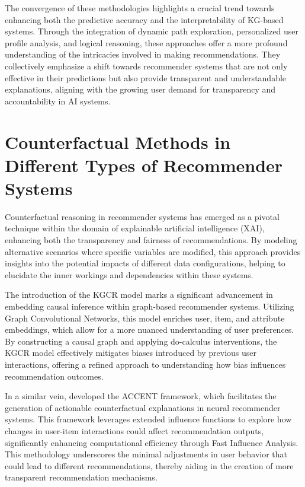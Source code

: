 The convergence of these methodologies highlights a crucial trend towards enhancing
both the predictive accuracy and the interpretability of KG-based systems.
Through the integration of dynamic path exploration, personalized user profile analysis,
and logical reasoning, these approaches offer a more profound understanding of the
intricacies involved in making recommendations. They collectively emphasize a
shift towards recommender systems that are not only effective in their
predictions but also provide transparent and understandable explanations, aligning
with the growing user demand for transparency and accountability in AI systems.

\section{Counterfactual Methods in Different Types of Recommender Systems}

Counterfactual reasoning in recommender systems has emerged as a pivotal
technique within the domain of explainable artificial intelligence (XAI), enhancing
both the transparency and fairness of recommendations. By modeling alternative
scenarios where specific variables are modified, this approach provides insights
into the potential impacts of different data configurations, helping to
elucidate the inner workings and dependencies within these systems.

The introduction of the KGCR model \parencite{wei_causal_2023} marks a significant advancement
in embedding causal inference within graph-based recommender systems. Utilizing
Graph Convolutional Networks, this model enriches user, item, and attribute embeddings,
which allow for a more nuanced understanding of user preferences. By constructing
a causal graph and applying do-calculus interventions, the KGCR model
effectively mitigates biases introduced by previous user interactions, offering a
refined approach to understanding how bias influences recommendation outcomes.

In a similar vein, \textcite{tran_counterfactual_2021} developed the ACCENT framework, which
facilitates the generation of actionable counterfactual explanations in neural
recommender systems. This framework leverages extended influence functions to explore
how changes in user-item interactions could affect recommendation outputs,
significantly enhancing computational efficiency through Fast Influence Analysis.
This methodology underscores the minimal adjustments in user behavior that could
lead to different recommendations, thereby aiding in the creation of more
transparent recommendation mechanisms.

